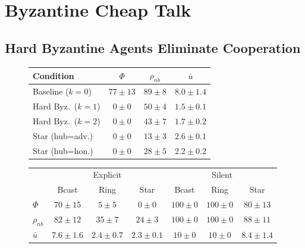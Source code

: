 \documentclass[runningheads]{llncs}
\begin{document}
\section{Byzantine Cheap Talk}\label{sec:byzantine}


\subsection{Hard Byzantine Agents Eliminate Cooperation}\label{sec:byz-hard}



\begin{figure}[t]
\begin{minipage}[t]{0.44\textwidth}
\footnotesize
\centering
{}\label{tab:byzantine}
\smallskip
\begin{tabular}{@{}lccc@{}}
\toprule
Condition & $\Phi$ & $\rho_{nb}$ & $\bar{u}$ \\
\midrule
Baseline ($k{=}0$)        & $77{\pm}13$ & $89{\pm}8$  & $8.0{\pm}1.4$ \\
Hard Byz.\ ($k{=}1$)      & $0{\pm}0$   & $50{\pm}4$  & $1.5{\pm}0.1$ \\
Hard Byz.\ ($k{=}2$)      & $0{\pm}0$   & $43{\pm}7$  & $1.7{\pm}0.2$ \\
Star (hub{=}adv.)         & $0{\pm}0$   & $13{\pm}3$  & $2.6{\pm}0.1$ \\
Star (hub{=}hon.)         & $0{\pm}0$   & $28{\pm}5$  & $2.2{\pm}0.2$ \\
\bottomrule
\end{tabular}
\end{minipage}
\hfill
\begin{minipage}[t]{0.53\textwidth}
\footnotesize
\centering
{}\label{tab:topology}
\smallskip
\begin{tabular}{@{}lcccccc@{}}
\toprule
& \multicolumn{3}{c}{Explicit} & \multicolumn{3}{c}{Silent} \\
\cmidrule(lr){2-4} \cmidrule(lr){5-7}
& Bcast & Ring & Star & Bcast & Ring & Star \\
\midrule
$\Phi$      & $70{\pm}15$   & $5{\pm}5$    & $0{\pm}0$   & $100{\pm}0$  & $100{\pm}0$  & $80{\pm}13$ \\
$\rho_{nb}$    & $82{\pm}12$   & $35{\pm}7$   & $24{\pm}3$  & $100{\pm}0$  & $100{\pm}0$  & $88{\pm}11$ \\
$\bar{u}$   & $7.6{\pm}1.6$ & $2.4{\pm}0.7$ & $2.3{\pm}0.1$ & $10{\pm}0$ & $10{\pm}0$  & $8.4{\pm}1.4$ \\
\bottomrule
\end{tabular}
\end{minipage}
\end{figure}
\end{document}
